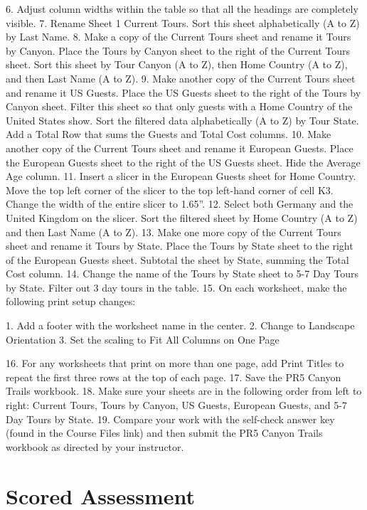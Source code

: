 6. Adjust column widths within the table so that all the headings are completely visible.
7. Rename Sheet 1 Current Tours. Sort this sheet alphabetically (A to Z) by Last Name.
8. Make a copy of the Current Tours sheet and rename it Tours by Canyon. Place the Tours by
Canyon sheet to the right of the Current Tours sheet. Sort this sheet by Tour Canyon (A to Z),
then Home Country (A to Z), and then Last Name (A to Z).
9. Make another copy of the Current Tours sheet and rename it US Guests. Place the US Guests
sheet to the right of the Tours by Canyon sheet. Filter this sheet so that only guests with a Home
Country of the United States show. Sort the filtered data alphabetically (A to Z) by Tour State.
Add a Total Row that sums the Guests and Total Cost columns.
10. Make another copy of the Current Tours sheet and rename it European Guests. Place the
European Guests sheet to the right of the US Guests sheet. Hide the Average Age column.
11. Insert a slicer in the European Guests sheet for Home Country. Move the top left corner of the
slicer to the top left-hand corner of cell K3. Change the width of the entire slicer to 1.65”.
12. Select both Germany and the United Kingdom on the slicer. Sort the filtered sheet by Home
Country (A to Z) and then Last Name (A to Z).
13. Make one more copy of the Current Tours sheet and rename it Tours by State. Place the Tours
by State sheet to the right of the European Guests sheet. Subtotal the sheet by State, summing
the Total Cost column.
14. Change the name of the Tours by State sheet to 5-7 Day Tours by State. Filter out 3 day tours in
the table.
15. On each worksheet, make the following print setup changes:

1. Add a footer with the worksheet name in the center.
2. Change to Landscape Orientation
3. Set the scaling to Fit All Columns on One Page

16. For any worksheets that print on more than one page, add Print Titles to repeat the first three
rows at the top of each page.
17. Save the PR5 Canyon Trails workbook.
18. Make sure your sheets are in the following order from left to right: Current Tours, Tours by
Canyon, US Guests, European Guests, and 5-7 Day Tours by State.
19. Compare your work with the self-check answer key (found in the Course Files link) and then
submit the PR5 Canyon Trails workbook as directed by your instructor.


\section{Scored Assessment}





